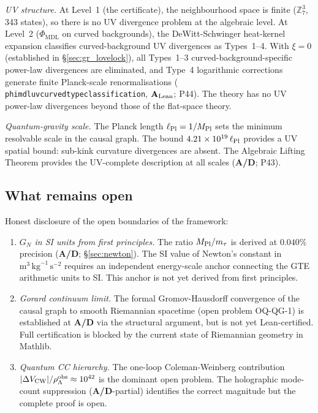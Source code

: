 \documentclass[11pt,openany]{book}
\theoremstyle{remark}
\newcommand{\PHIMDL}{\Phi_{\mathrm{MDL}}}
\newcommand{\ZS}{\mathbb{Z}_7}
\newcommand{\lean}[1]{%
  \penalty-100
  \begingroup\def\_{\textunderscore\allowbreak}\texttt{#1}\endgroup}
\newcommand{\mtau}{m_\tau}
\newcommand{\MPl}{M_{\rm Pl}}
\newcommand{\GN}{G_N}
\newcommand{\CMCA}{\text{CMCA}}
\newcommand{\CatAL}{\ensuremath{\textbf{A}_{\rm Lean}}}
\newcommand{\CatAD}{\textbf{A/D}}
\begin{document}
\textit{UV structure.}
At Level~1 (the \CMCA{} certificate), the neighbourhood space is finite ($\ZS^3$,
343 states), so there is no UV divergence problem at the algebraic level.
At Level~2 ($\PHIMDL$ on curved backgrounds), the DeWitt-Schwinger heat-kernel
expansion classifies curved-background UV divergences as Types~1--4.
With $\xi = 0$ (established in \S\ref{sec:gr_lovelock}), all Types~1--3
curved-background-specific power-law divergences are eliminated, and Type~4
logarithmic corrections generate finite Planck-scale renormalisations
(\lean{phimdl\_uv\_curved\_type\_classification}, \CatAL; P44).
The theory has no UV power-law divergences beyond those of the flat-space theory.

\textit{Quantum-gravity scale.}
The Planck length $\ell_{\rm Pl} = 1/\MPl$ sets the minimum resolvable scale in the
\CMCA{} causal graph.
The bound $4.21\times10^{19}\,\ell_{\rm Pl}$ provides a UV spatial bound: sub-kink
curvature divergences are absent.
The Algebraic Lifting Theorem provides the UV-complete description at all scales
(\CatAD; P43).

\subsection*{What remains open}

Honest disclosure of the open boundaries of the framework:

\begin{enumerate}
\item \textit{$\GN$ in SI units from first principles.}
  The ratio $\MPl/\mtau$ is derived at $0.040\%$ precision (\CatAD; \S\ref{sec:newton}).
  The SI value of Newton's constant in $\mathrm{m}^3\,\mathrm{kg}^{-1}\,\mathrm{s}^{-2}$
  requires an independent energy-scale anchor connecting the GTE arithmetic units to SI.
  This anchor is not yet derived from first principles.

\item \textit{Gorard continuum limit.}
  The formal Gromov-Hausdorff convergence of the \CMCA{} causal graph to smooth
  Riemannian spacetime (open problem OQ-QG-1) is established at \CatAD{} via the
  structural argument, but is not yet Lean-certified.
  Full certification is blocked by the current state of Riemannian geometry in Mathlib.

\item \textit{Quantum CC hierarchy.}
  The one-loop Coleman-Weinberg contribution
  $|\Delta V_{\rm CW}|/\rho_\Lambda^{\rm obs} \approx 10^{42}$
  is the dominant open problem.
  The holographic mode-count suppression (\CatAD-partial) identifies the correct
  magnitude but the complete proof is open.
\end{enumerate}
\end{document}
